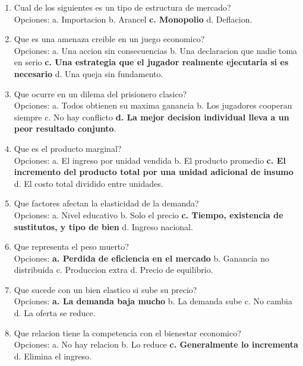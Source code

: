\documentclass[
	spanish,
	letterpaper, oneside
]{article}
\begin{document}
\begin{enumerate}
	\item Cual de los siguientes es un tipo de estructura de mercado?\\
	Opciones: a. Importacion \quad b. Arancel \quad \textbf{c. Monopolio} \quad d. Deflacion.

	\item Que es una amenaza creible en un juego economico?\\
	Opciones: a. Una accion sin consecuencias \quad b. Una declaracion que nadie toma en serio \quad \textbf{c. Una estrategia que el jugador realmente ejecutaria si es necesario} \quad d. Una queja sin fundamento.

	\item Que ocurre en un dilema del prisionero clasico?\\
	Opciones: a. Todos obtienen su maxima ganancia \quad b. Los jugadores cooperan siempre \quad c. No hay conflicto \quad \textbf{d. La mejor decision individual lleva a un peor resultado conjunto}.

	\item Que es el producto marginal?\\
	Opciones: a. El ingreso por unidad vendida \quad b. El producto promedio \quad \textbf{c. El incremento del producto total por una unidad adicional de insumo} \quad d. El costo total dividido entre unidades.

	\item Que factores afectan la elasticidad de la demanda?\\
	Opciones: a. Nivel educativo \quad b. Solo el precio \quad \textbf{c. Tiempo, existencia de sustitutos, y tipo de bien} \quad d. Ingreso nacional.

	\item Que representa el peso muerto?\\
	Opciones: \textbf{a. Perdida de eficiencia en el mercado} \quad b. Ganancia no distribuida \quad c. Produccion extra \quad d. Precio de equilibrio.

	\item Que sucede con un bien elastico si sube su precio?\\
	Opciones: \textbf{a. La demanda baja mucho} \quad b. La demanda sube \quad c. No cambia \quad d. La oferta se reduce.

	\item Que relacion tiene la competencia con el bienestar economico?\\
	Opciones: a. No hay relacion \quad b. Lo reduce \quad \textbf{c. Generalmente lo incrementa} \quad d. Elimina el ingreso.


\end{enumerate}
\end{document}
